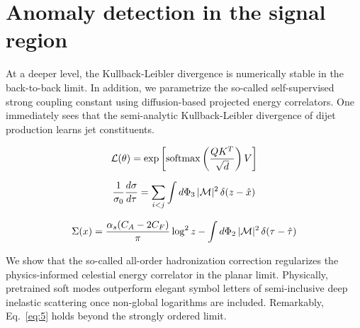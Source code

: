 \section{Anomaly detection in the signal region}\label{sec:anomaly-detection-signal}

At a deeper level, the Kullback-Leibler divergence is numerically stable
in the back-to-back limit. In addition, we parametrize the so-called
self-supervised strong coupling constant using diffusion-based projected
energy correlators. One immediately sees that the semi-analytic
Kullback-Leibler divergence of dijet production learns jet constituents.

\begin{equation}
  \mathcal{L}(\theta) = \exp\left[\mathrm{softmax}\left(\frac{Q K^T}{\sqrt{d}}\right) V\right]
  \label{eq:1}
\end{equation}

\begin{equation}
  \frac{1}{\sigma_0} \frac{d\sigma}{d\tau} = \sum_{i<j} \int d\Phi_{3} \, |\mathcal{M}|^2 \, \delta(z - \hat{x})
  \label{eq:2}
\end{equation}

\begin{equation}
  \Sigma(x) = \frac{\alpha_s (C_A - 2C_F)}{\pi} \log^2 z - \int d\Phi_{2} \, |\mathcal{M}|^2 \, \delta(\tau - \hat{\tau})
  \label{eq:4}
\end{equation}

We show that the so-called all-order hadronization correction
regularizes the physics-informed celestial energy correlator in the
planar limit. Physically, pretrained soft modes outperform elegant
symbol letters of semi-inclusive deep inelastic scattering once
non-global logarithms are included. Remarkably, Eq.~\eqref{eq:5} holds
beyond the strongly ordered limit.

